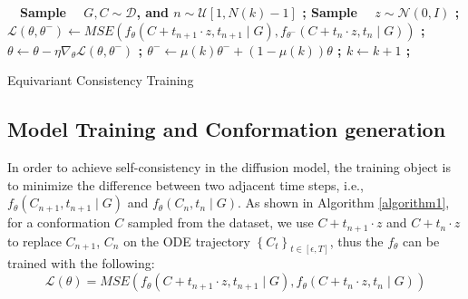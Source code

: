 \documentclass{article} %
\begin{document}
\IncMargin{1em}
\begin{algorithm}
	\footnotesize
	
	
	\BlankLine
	{\ \ 
		\bf{Sample} $\quad G, C \sim \mathcal{D}$, and $n \sim \mathcal{U}[1, N(k)-1]$ ;\newline
		\bf{Sample} $\quad {z} \sim \mathcal{N}({0}, {I})$ ;\newline
		$\mathcal{L}\left({\theta}, {\theta^{-}}\right) \leftarrow MSE \left(f_{{\theta}}\left(C+t_{n+1} \cdot z, t_{n+1} \mid G\right), f_{{\theta^{-}}}\left(C+t_n \cdot z, t_n \mid G\right)\right)$ ;\newline
		${\theta} \leftarrow {\theta}-\eta \nabla_{{\theta}} \mathcal{L}\left({\theta}, {\theta}^{-}\right)$ ;\newline
		${\theta^{-}} \leftarrow \mu(k) {\theta^{-}}+(1-\mu(k)) {\theta}$ ;\newline
		$k \leftarrow k+1$ ;\newline}
	
	
	\caption{Equivariant Consistency Training}
	\label{algorithm1}
\end{algorithm}
\DecMargin{1em}


\subsection{Model Training and Conformation generation}
In order to achieve self-consistency in the diffusion model, the training object is to minimize the difference between two adjacent time steps, i.e., $f_\theta\left(C_{n+1}, t_{n+1} \mid G\right)$ and  $f_\theta\left(C_n, t_n \mid G\right)$. As shown in Algorithm \ref{algorithm1}, for a conformation $C$ sampled from the dataset, we use $C+t_{n+1} \cdot z$ and $C+t_{n} \cdot z$ to replace $C_{n+1}$, $C_n$ on the ODE trajectory $\left\{C_t\right\}_{t \in[\epsilon, T]}$,  thus the $f_\theta$ can be trained with the following:
\begin{equation}
	\mathcal{L}(\theta)=MSE\left(f_\theta\left(C+t_{n+1} \cdot z, t_{n+1} \mid G\right), f_\theta\left(C+t_n \cdot z, t_n \mid G\right)\right)
\end{equation}
\end{document}
